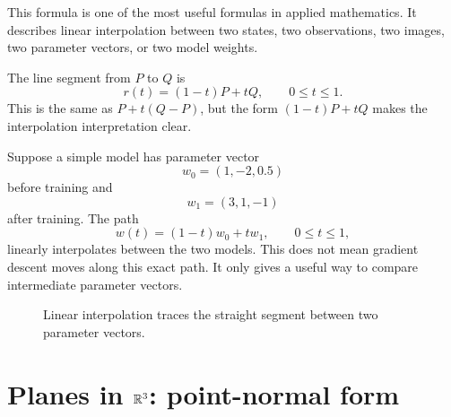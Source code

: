 This formula is one of the most useful formulas in applied mathematics. It describes linear interpolation between two states, two observations, two images, two parameter vectors, or two model weights.

\begin{mainideabox}
The line segment from $P$ to $Q$ is
\[
  r(t)=(1-t)P+tQ,\qquad 0\le t\le 1.
\]
This is the same as $P+t(Q-P)$, but the form $(1-t)P+tQ$ makes the interpolation interpretation clear.
\end{mainideabox}

\begin{examplebox}[title={Example 4.3: Interpolating between two model parameter vectors}]
Suppose a simple model has parameter vector
\[
  w_0=(1,-2,0.5)
\]
before training and
\[
  w_1=(3,1,-1)
\]
after training. The path
\[
  w(t)=(1-t)w_0+tw_1,\qquad 0\le t\le 1,
\]
linearly interpolates between the two models. This does not mean gradient descent moves along this exact path. It only gives a useful way to compare intermediate parameter vectors.
\end{examplebox}

\begin{figure}[H]
\centering
{}
\caption{Linear interpolation traces the straight segment between two parameter vectors.}
\end{figure}

\section{Planes in $\mathbb{R}^3$: point-normal form}

